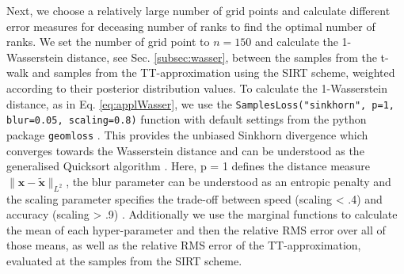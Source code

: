 Next, we choose a relatively large number of grid points and calculate different error measures for deceasing number of ranks to find the optimal number of ranks.
We set the number of grid point to $n = 150$ and calculate the 1-Wasserstein distance, see Sec. \ref{subsec:wasser}, between the samples from the t-walk and samples from the TT-approximation using the SIRT scheme, weighted according to their posterior distribution values.  
To calculate the 1-Wasserstein distance, as in Eq. \ref{eq:applWasser}, we use the \texttt{SamplesLoss("sinkhorn", p=1, blur=0.05, scaling=0.8)} function with default settings from the python package \texttt{geomloss} \cite{Wassersteinaccess}.
This provides the unbiased Sinkhorn divergence which converges towards the Wasserstein distance and can be understood as the generalised Quicksort algorithm \cite{feydy2020OT}.
Here, p = 1 defines the distance measure $\lVert \bm{x} -\tilde{\bm{x}} \rVert_{L^2}$, the blur parameter can be understood as an entropic penalty and the  scaling parameter specifies the trade-off between speed (scaling < .4) and accuracy (scaling > .9) \cite{Wassersteinaccess}.
Additionally we use the marginal functions to calculate the mean of each hyper-parameter and then the relative RMS error over all of those means, as well as the relative RMS error of the TT-approximation, evaluated at the samples from the SIRT scheme.

